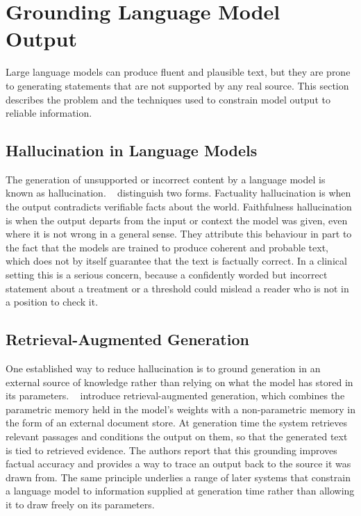 \section{Grounding Language Model Output}
\label{sec:bg-grounding}

Large language models can produce fluent and plausible text, but they are
prone to generating statements that are not supported by any real source. This
section describes the problem and the techniques used to constrain model output
to reliable information.

\subsection{Hallucination in Language Models}
\label{sec:bg-grounding-hallucination}

The generation of unsupported or incorrect content by a language model is known
as hallucination. ~\cite{huang2025} distinguish two forms.
Factuality hallucination is when the output contradicts verifiable facts about
the world. Faithfulness hallucination is when the output departs from the input
or context the model was given, even where it is not wrong in a general sense.
They attribute this behaviour in part to the fact that the models are trained
to produce coherent and probable text, which does not by itself guarantee that
the text is factually correct. In a clinical setting this is a serious concern,
because a confidently worded but incorrect statement about a treatment or a
threshold could mislead a reader who is not in a position to check it.

\subsection{Retrieval-Augmented Generation}
\label{sec:bg-grounding-rag}

One established way to reduce hallucination is to ground generation in an
external source of knowledge rather than relying on what the model has stored
in its parameters. ~\cite{lewis2021} introduce retrieval-augmented
generation, which combines the parametric memory held in the model's weights
with a non-parametric memory in the form of an external document store. At
generation time the system retrieves relevant passages and conditions the
output on them, so that the generated text is tied to retrieved evidence. The
authors report that this grounding improves factual accuracy and provides a way
to trace an output back to the source it was drawn from. The same principle
underlies a range of later systems that constrain a language model to
information supplied at generation time rather than allowing it to draw freely
on its parameters.

